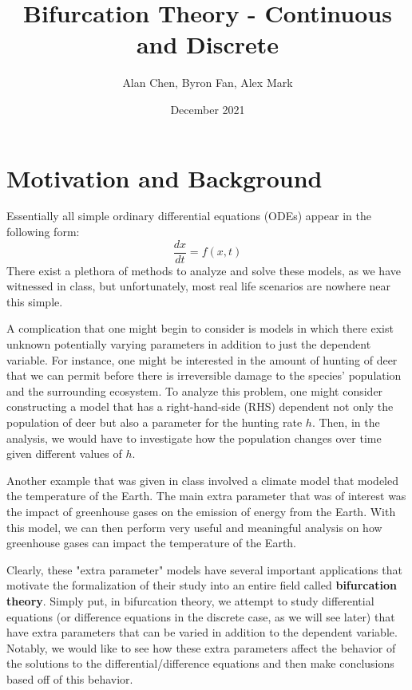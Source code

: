 \documentclass{article}
\title{Bifurcation Theory - Continuous and Discrete}
\author{Alan Chen, Byron Fan, Alex Mark}
\date{December 2021}
\theoremstyle{definition}
\theoremstyle{remark}
\begin{document}
\maketitle

\tableofcontents
\pagebreak
\section{Motivation and Background}
Essentially all simple ordinary differential equations (ODEs) appear in the following form:
\begin{equation}
    \frac{dx}{dt} = f(x, t)
\end{equation}
There exist a plethora of methods to analyze and solve these models, as we have witnessed in class, but unfortunately, most real life scenarios are nowhere near this simple. 

A complication that one might begin to consider is models in which there exist unknown potentially varying parameters in addition to just the dependent variable. For instance, one might be interested in the amount of hunting of deer that we can permit before there is irreversible damage to the species' population and the surrounding ecosystem. To analyze this problem, one might consider constructing a model that has a right-hand-side (RHS) dependent not only the population of deer but also a parameter for the hunting rate $h$. Then, in the analysis, we would have to investigate how the population changes over time given different values of $h$. 

Another example that was given in class involved a climate model that modeled the temperature of the Earth. The main extra parameter that was of interest was the impact of greenhouse gases on the emission of energy from the Earth. With this model, we can then perform very useful and meaningful analysis on how greenhouse gases can impact the temperature of the Earth.    

Clearly, these "extra parameter" models have several important applications that motivate the formalization of their study into an entire field called \textbf{bifurcation theory}. Simply put, in bifurcation theory, we attempt to study differential equations (or difference equations in the discrete case, as we will see later) that have extra parameters that can be varied in addition to the dependent variable. Notably, we would like to see how these extra parameters affect the behavior of the solutions to the differential/difference equations and then make conclusions based off of this behavior. 
\end{document}
